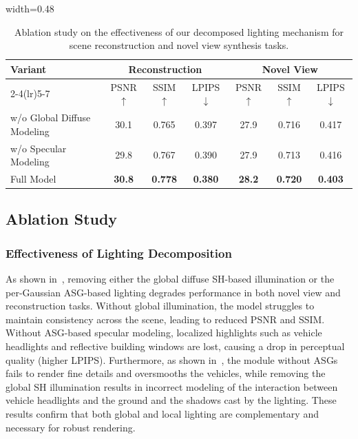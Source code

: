 \documentclass[letterpaper, 10 pt, conference]{ieeeconf}  %
\newcommand{\best}[1]{\cellcolor{best}\textbf{#1}}
\begin{document}
\begin{table}[t]
\caption{Ablation study on the effectiveness of our decomposed lighting mechanism for scene reconstruction and novel view synthesis tasks.}
\label{tab:ablation1}
\centering
\scriptsize
\setlength{\tabcolsep}{3pt}
\renewcommand{\arraystretch}{1.12}
\begin{adjustbox}{width=0.48\textwidth} %
\begin{tabular}{lccc ccc}
\toprule
\multirow{2}{*}{Variant} &
\multicolumn{3}{c}{Reconstruction} &
\multicolumn{3}{c}{Novel View}  \\
\cmidrule(lr){2-4}\cmidrule(lr){5-7}
& PSNR$\uparrow$ & SSIM$\uparrow$ & LPIPS$\downarrow$ 
& PSNR$\uparrow$ & SSIM$\uparrow$ & LPIPS$\downarrow$ \\
\midrule
w/o Global Diffuse Modeling
& 30.1 & 0.765 & 0.397
& 27.9 & 0.716 & 0.417 
\\

w/o Specular Modeling
& 29.8 & 0.767 & 0.390 
& 27.9 & 0.713 & 0.416 
\\

Full Model
& \best{30.8} & \best{0.778} & \best{0.380} 
& \best{28.2} & \best{0.720} & \best{0.403} 
\\
\bottomrule
\end{tabular}
\end{adjustbox}
\end{table}


\subsection{Ablation Study}

\subsubsection{Effectiveness of Lighting Decomposition}
As shown in~, removing either the global diffuse SH-based illumination or the per-Gaussian ASG-based lighting degrades performance in both novel view and reconstruction tasks. Without global illumination, the model struggles to maintain consistency across the scene, leading to reduced PSNR and SSIM. Without ASG-based specular modeling, localized highlights such as vehicle headlights and reflective building windows are lost, causing a drop in perceptual quality (higher LPIPS). 
Furthermore, as shown in~, the module without ASGs fails to render fine details and oversmooths the vehicles, while removing the global SH illumination results in incorrect modeling of the interaction between vehicle headlights and the ground and the shadows cast by the lighting.
These results confirm that both global and local lighting are complementary and necessary for robust rendering.
\end{document}
